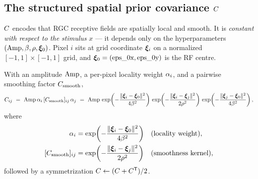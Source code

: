 \subsection{The structured spatial prior covariance $C$}
\label{subsec:Cprior}

$C$ encodes that RGC receptive fields are spatially local and smooth. It is
\emph{constant with respect to the stimulus} $x$ --- it depends only on the
hyperparameters $(\mathrm{Amp},\beta,\rho,\bm{\xi}_{0})$. Pixel $i$ sits at grid coordinate
$\bm{\xi}_i$ on a normalized $[-1,1]\times[-1,1]$ grid, and $\bm{\xi}_{0}=(\text{eps\_0x},\text{eps\_0y})$
is the RF centre.

\begin{definition}
With an amplitude $\mathrm{Amp}$, a per-pixel locality weight $\alpha_i$, and a pairwise
smoothing factor $C_{\mathrm{smooth}}$,
\begin{equation}
\Cmat_{ij}
\ =\ \Amp\,\loc_i\,[\Csm]_{ij}\,\loc_j
\ =\ \Amp\,\exp\!\left(-\frac{\lVert\pixc_i-\rfc\rVert^2}{4\bwid^2}\right)\,
      \exp\!\left(-\frac{\lVert\pixc_i-\pixc_j\rVert^2}{2\smoo^2}\right)\,
      \exp\!\left(-\frac{\lVert\pixc_j-\rfc\rVert^2}{4\bwid^2}\right),
\label{eq:Cprior}
\end{equation}
where
\begin{equation}
\begin{aligned}
\loc_i&=\exp\!\left(-\frac{\lVert\pixc_i-\rfc\rVert^2}{4\bwid^2}\right)
&&\text{(locality weight)},\\
[\Csm]_{ij}&=\exp\!\left(-\frac{\lVert\pixc_i-\pixc_j\rVert^2}{2\smoo^2}\right)
&&\text{(smoothness kernel)},
\end{aligned}
\end{equation}
followed by a symmetrization $C\leftarrow(C+C^{\mathsf{T}})/2$.
\end{definition}

